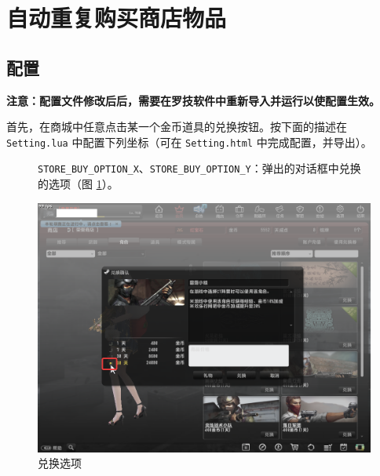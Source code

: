 \section{自动重复购买商店物品}

\subsection{配置}

\textbf{\color{red}注意：配置文件修改后后，需要在罗技软件中重新导入并运行以使配置生效。}

首先，在商城中任意点击某一个金币道具的兑换按钮。按下面的描述在 \lstinline{Setting.lua} 中配置下列坐标（可在 \lstinline{Setting.html} 中完成配置，并导出）。

\begin{figure}[H]
    \Centering
    \parbox[l]{\textwidth}{\lstinline{STORE_BUY_OPTION_X}、\lstinline{STORE_BUY_OPTION_Y}：弹出的对话框中兑换的选项（图 \ref{ch4fig-store-buy-option}）。}
    \includegraphics[width=\textwidth]{docs/assets/store_buy_option.png}
    \caption{兑换选项}
    \label{ch4fig-store-buy-option}
\end{figure}
\clearpage

